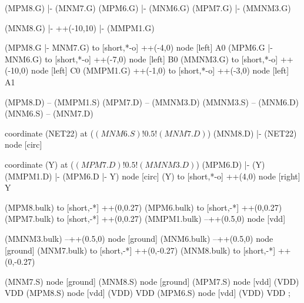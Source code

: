 \begin{circuitikz}[american]
	(MPM8.G) |- (MNM7.G)
	(MPM6.G) |- (MNM6.G)
	(MPM7.G) |- (MMNM3.G)
	
	(MNM8.G) |- ++(-10,10) |- (MMPM1.G)
	
	(MPM8.G |- MNM7.G) to [short,*-o] ++(-4,0) node [left] {A0}
	(MPM6.G |- MNM6.G) to [short,*-o] ++(-7,0) node [left] {B0}
	(MMNM3.G) to [short,*-o] ++(-10,0) node [left] {C0}
	(MMPM1.G) ++(-1,0) to [short,*-o] ++(-3,0) node [left] {A1}
	
	(MPM8.D) -- (MMPM1.S)
	(MPM7.D) -- (MMNM3.D)
	(MMNM3.S) -- (MNM6.D)
	(MNM6.S) -- (MNM7.D)
	
	coordinate (NET22) at ($(MNM6.S)!0.5!(MNM7.D)$)
	(MNM8.D) |- (NET22) node [circ] {}
	
	coordinate (Y) at ($(MPM7.D)!0.5!(MMNM3.D)$)
	(MPM6.D) |- (Y)
	(MMPM1.D) |- (MPM6.D |- Y) node [circ] {}
	(Y) to [short,*-o] ++(4,0) node [right] {Y}
	
	(MPM8.bulk) to [short,-*] ++(0,0.27)
	(MPM6.bulk) to [short,-*] ++(0,0.27)	
	(MPM7.bulk) to [short,-*] ++(0,0.27)	
	(MMPM1.bulk) --++(0.5,0) node [vdd]{}
	
	(MMNM3.bulk) --++(0.5,0) node [ground]{}
	(MNM6.bulk) --++(0.5,0) node [ground]{}
	(MNM7.bulk) to [short,-*] ++(0,-0.27) 
	(MNM8.bulk) to [short,-*] ++(0,-0.27)


	(MNM7.S) node [ground] {}
	(MNM8.S) node [ground] {}
	(MPM7.S) node [vdd] (VDD) {VDD}
	(MPM8.S) node [vdd] (VDD) {VDD}
	(MPM6.S) node [vdd] (VDD) {VDD}
;

\end{circuitikz}
